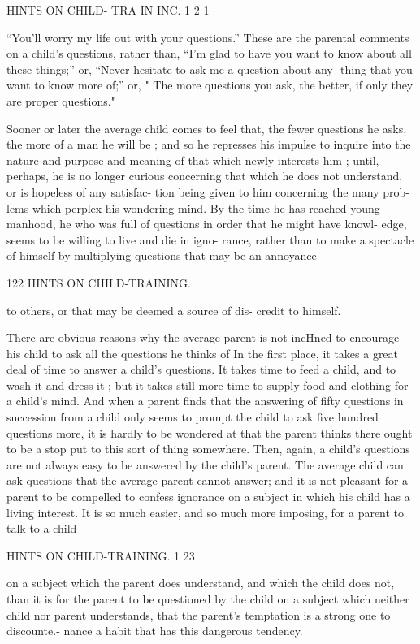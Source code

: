 \documentclass[
]{book}
\begin{document}
HINTS ON CHILD- TRA IN INC. 1 2 1

``You'll worry my life out with your questions.'' These are the parental comments on a child's questions, rather than, ``I'm glad to have you want to know about all these things;'' or, ``Never hesitate to ask me a question about any- thing that you want to know more of;'' or, " The more questions you ask, the better, if only they are proper questions."

Sooner or later the average child comes to feel that, the fewer questions he asks, the more of a man he will be ; and so he represses his impulse to inquire into the nature and purpose and meaning of that which newly interests him ; until, perhaps, he is no longer curious concerning that which he does not understand, or is hopeless of any satisfac- tion being given to him concerning the many prob- lems which perplex his wondering mind. By the time he has reached young manhood, he who was full of questions in order that he might have knowl- edge, seems to be willing to live and die in igno- rance, rather than to make a spectacle of himself by multiplying questions that may be an annoyance

122 HINTS ON CHILD-TRAINING.

to others, or that may be deemed a source of dis- credit to himself.

There are obvious reasons why the average parent is not incHned to encourage his child to ask all the questions he thinks of In the first place, it takes a great deal of time to answer a child's questions. It takes time to feed a child, and to wash it and dress it ; but it takes still more time to supply food and clothing for a child's mind. And when a parent finds that the answering of fifty questions in succession from a child only seems to prompt the child to ask five hundred questions more, it is hardly to be wondered at that the parent thinks there ought to be a stop put to this sort of thing somewhere. Then, again, a child's questions are not always easy to be answered by the child's parent. The average child can ask questions that the average parent cannot answer; and it is not pleasant for a parent to be compelled to confess ignorance on a subject in which his child has a living interest. It is so much easier, and so much more imposing, for a parent to talk to a child

HINTS ON CHILD-TRAINING. 1 23

on a subject which the parent does understand, and which the child does not, than it is for the parent to be questioned by the child on a subject which neither child nor parent understands, that the parent's temptation is a strong one to discounte.- nance a habit that has this dangerous tendency.
\end{document}
